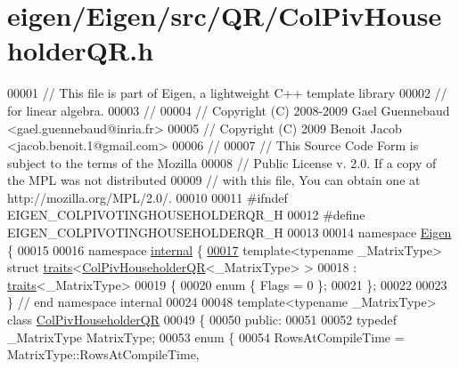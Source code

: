 \hypertarget{eigen_2_eigen_2src_2_q_r_2_col_piv_householder_q_r_8h_source}{}\section{eigen/\+Eigen/src/\+Q\+R/\+Col\+Piv\+Householder\+QR.h}
\label{eigen_2_eigen_2src_2_q_r_2_col_piv_householder_q_r_8h_source}

\begin{DoxyCode}
00001 \textcolor{comment}{// This file is part of Eigen, a lightweight C++ template library}
00002 \textcolor{comment}{// for linear algebra.}
00003 \textcolor{comment}{//}
00004 \textcolor{comment}{// Copyright (C) 2008-2009 Gael Guennebaud <gael.guennebaud@inria.fr>}
00005 \textcolor{comment}{// Copyright (C) 2009 Benoit Jacob <jacob.benoit.1@gmail.com>}
00006 \textcolor{comment}{//}
00007 \textcolor{comment}{// This Source Code Form is subject to the terms of the Mozilla}
00008 \textcolor{comment}{// Public License v. 2.0. If a copy of the MPL was not distributed}
00009 \textcolor{comment}{// with this file, You can obtain one at http://mozilla.org/MPL/2.0/.}
00010 
00011 \textcolor{preprocessor}{#ifndef EIGEN\_COLPIVOTINGHOUSEHOLDERQR\_H}
00012 \textcolor{preprocessor}{#define EIGEN\_COLPIVOTINGHOUSEHOLDERQR\_H}
00013 
00014 \textcolor{keyword}{namespace }\hyperlink{namespace_eigen}{Eigen} \{
00015 
00016 \textcolor{keyword}{namespace }\hyperlink{namespaceinternal}{internal} \{
\hyperlink{struct_eigen_1_1internal_1_1traits_3_01_col_piv_householder_q_r_3_01___matrix_type_01_4_01_4}{00017} \textcolor{keyword}{template}<\textcolor{keyword}{typename} \_MatrixType> \textcolor{keyword}{struct }\hyperlink{struct_eigen_1_1internal_1_1traits}{traits}<\hyperlink{group___q_r___module_class_eigen_1_1_col_piv_householder_q_r}{ColPivHouseholderQR}<\_MatrixType> >
00018  : \hyperlink{struct_eigen_1_1internal_1_1traits}{traits}<\_MatrixType>
00019 \{
00020   \textcolor{keyword}{enum} \{ Flags = 0 \};
00021 \};
00022 
00023 \} \textcolor{comment}{// end namespace internal}
00024 
00048 \textcolor{keyword}{template}<\textcolor{keyword}{typename} \_MatrixType> \textcolor{keyword}{class }\hyperlink{group___q_r___module_class_eigen_1_1_col_piv_householder_q_r}{ColPivHouseholderQR}
00049 \{
00050   \textcolor{keyword}{public}:
00051 
00052     \textcolor{keyword}{typedef} \_MatrixType MatrixType;
00053     \textcolor{keyword}{enum} \{
00054       RowsAtCompileTime = MatrixType::RowsAtCompileTime,

\end{DoxyCode}
